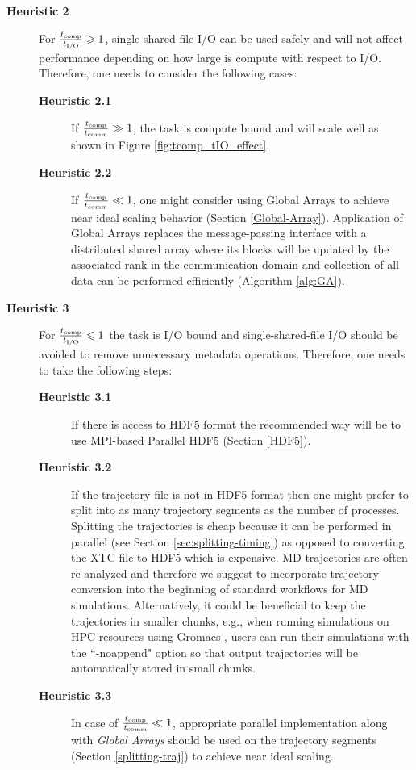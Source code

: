 \begin{description}
\item[\textbf{Heuristic 2}] For $\frac{{t}_{\text{comp}}}{{t}_{\text{I/O}}} \geqslant 1$, single-shared-file I/O can be used safely and will not affect performance depending on how large is compute with respect to I/O. Therefore, one needs to consider the following cases: 
  \begin{description}
  \item[\textbf{Heuristic 2.1}] If $\frac{{t}_{\text{comp}}}{t_{\text{comm}}} \gg 1$, the task is compute bound and will scale well as shown in Figure \ref{fig:tcomp_tIO_effect}. 
  \item[\textbf{Heuristic 2.2}] If $\frac{{t}_{\text{comp}}}{t_{\text{comm}}} \ll 1$, one might consider using Global Arrays to achieve near ideal scaling behavior (Section \ref{Global-Array}).  Application of Global Arrays replaces the message-passing interface with a distributed shared array where its blocks will be updated by the associated rank in the communication domain and collection of all data can be performed efficiently (Algorithm \ref{alg:GA}).
  \end{description}
\item[\textbf{Heuristic 3}] For $\frac{{t}_{\text{comp}}}{{t}_{\text{I/O}}} \leqslant 1$ the task is I/O bound and single-shared-file I/O should be avoided to remove unnecessary metadata operations. Therefore, one needs to take the following steps:  
  \begin{description}
    \item[\textbf{Heuristic 3.1}] If there is access to HDF5 format the recommended way will be to use MPI-based Parallel HDF5 (Section \ref{HDF5}). 
    \item[\textbf{Heuristic 3.2}] If the trajectory file is not in HDF5 format then one might prefer to split into as many trajectory segments as the number of processes. Splitting the trajectories is cheap because it can be performed in parallel (see Section \ref{sec:splitting-timing}) as opposed to converting the XTC file to HDF5 which is expensive. MD trajectories are often re-analyzed and therefore we suggest to incorporate trajectory conversion into the beginning of standard workflows for MD simulations. Alternatively, it could be beneficial to keep the trajectories in smaller chunks, e.g., when running simulations on HPC resources using Gromacs \cite{Gromacs3, Gromacs1}, users can run their simulations with the ``-noappend" option so that output trajectories will be automatically stored in small chunks.
    \item[\textbf{Heuristic 3.3}] In case of $\frac{{t}_{\text{comp}}}{t_{\text{comm}}} \ll 1$, appropriate parallel implementation along with \emph{Global Arrays} should be used on the trajectory segments (Section \ref{splitting-traj}) to achieve near ideal scaling.
  \end{description}
\end{description}
